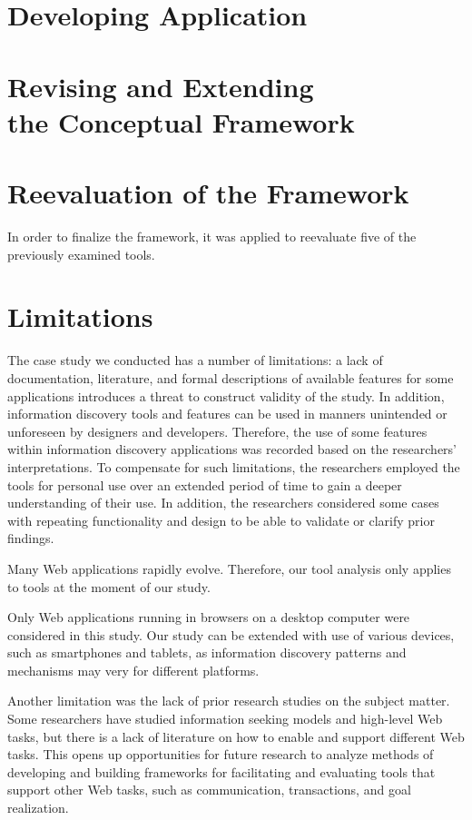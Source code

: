{\section{Developing Application}

}%

{\section{Revising and Extending \\the Conceptual Framework}

}%

{\section{Reevaluation of the Framework}
In order to finalize the framework, it was applied to reevaluate five of the previously examined tools. 
}%

{\section{Limitations}
The case study we conducted has a number of limitations: a lack of documentation, literature, and formal descriptions of available features for some applications introduces a threat to construct validity of the study. In addition, information discovery tools and features can be used in manners unintended or unforeseen by designers and developers. Therefore, the use of some features within information discovery applications was recorded based on the researchers' interpretations. To compensate for such limitations, the researchers employed the tools for personal use over an extended period of time to gain a deeper understanding of their use. In addition, the researchers considered some cases with repeating functionality and design to be able to validate or clarify prior findings. 

Many Web applications rapidly evolve. Therefore, our tool analysis only applies to tools at the moment of our study.

Only Web applications running in browsers on a desktop computer were considered in this study. Our study can be extended with use of various devices, such as smartphones and tablets, as information discovery patterns and mechanisms may very for different platforms. 

Another limitation was the lack of prior research studies on the subject matter. Some researchers have studied information seeking models and high-level Web tasks, but there is a lack of literature on how to enable and support different Web tasks. This opens up opportunities for future research to analyze methods of developing and building frameworks for facilitating and evaluating tools that support other Web tasks, such as communication, transactions, and goal realization.


} %

